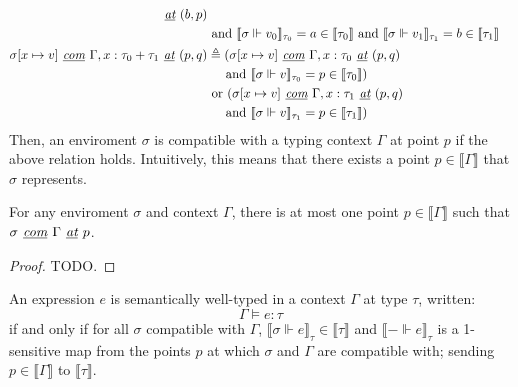 \begin{definition}
\begin{equation}
\begin{normalsize}
\begin{aligned}[c]
        \textit{ \underline{at} } (b, p) \\
      & \text{ and } \llbracket \sigma \Vdash v_0 \rrbracket_{\tau_0} = a \in
          \llbracket \tau_0 \rrbracket
        \text{ and } \llbracket \sigma \Vdash v_1 \rrbracket_{\tau_1} = b \in
          \llbracket \tau_1 \rrbracket \\
      \sigma[x \mapsto v] \textit{ \underline{com} } \Gamma, x : \tau_0 + \tau_1 \textit{ \underline{at} } (p, q)
      &\triangleq 
      (\sigma[x \mapsto v] \textit{ \underline{com} } \Gamma, x : \tau_0
      \textit{ \underline{at} } (p, q) \\
      &\> \> \> \> \> \text{ and } \llbracket \sigma \Vdash v \rrbracket_{\tau_0} = p
      \in \llbracket \tau_0 \rrbracket) \\
      & \text{ or } (\sigma[x \mapsto v] \textit{ \underline{com} } \Gamma, x :
      \tau_1 \textit{ \underline{at} } (p, q) \\
      &\> \> \> \> \> \text{ and } \llbracket \sigma \Vdash v \rrbracket_{\tau_1} = p
      \in \llbracket \tau_1 \rrbracket) \\
    \end{aligned}
    \end{normalsize}
  \end{equation}
  Then, an enviroment $\sigma$ is compatible with a typing context $\Gamma$ at
  point $p$ if the above relation holds. Intuitively, this means that there
  exists a point $p \in \llbracket \Gamma \rrbracket$ that $\sigma$ represents.
\end{definition}

\begin{theorem}
  For any enviroment $\sigma$ and context $\Gamma$, there is at most one point
  $p \in \llbracket \Gamma \rrbracket$ such that $\sigma \textit{
    \underline{com} } \Gamma \textit { \underline{at} } p$.
\end{theorem}
\begin{proof}
  TODO.
\end{proof}

\begin{definition}
  An expression $e$ is semantically well-typed in a context $\Gamma$ at type
  $\tau$, written:
  $$\Gamma \vDash e : \tau$$
  if and only if for all $\sigma$ compatible with $\Gamma$, $\llbracket \sigma
  \Vdash e \rrbracket_{\tau} \in \llbracket \tau \rrbracket$ and $\llbracket -
  \Vdash e \rrbracket_{\tau}$ is a 1-sensitive map from the points $p$ at which
  $\sigma$ and $\Gamma$ are compatible with; sending $p \in \llbracket \Gamma
  \rrbracket$ to $\llbracket \tau \rrbracket$.
\end{definition}

